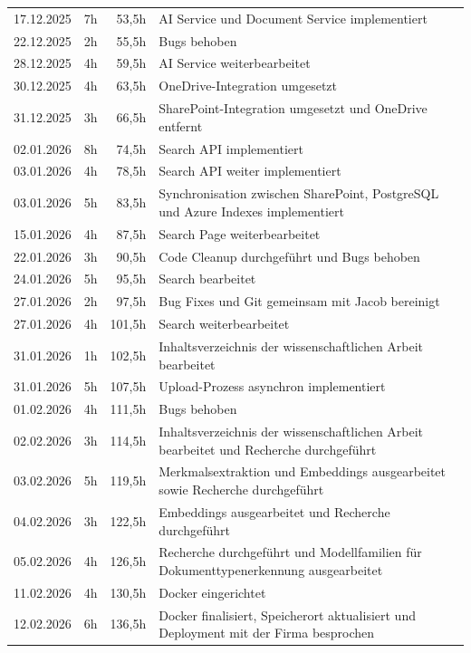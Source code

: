 \begin{longtable}{r | r | r | p{}}
    17.12.2025 & 7h & 53,5h & AI Service und Document Service implementiert \\
    22.12.2025 & 2h & 55,5h & Bugs behoben \\
    28.12.2025 & 4h & 59,5h & AI Service weiterbearbeitet \\
    30.12.2025 & 4h & 63,5h & OneDrive-Integration umgesetzt \\
    31.12.2025 & 3h & 66,5h & SharePoint-Integration umgesetzt und OneDrive entfernt \\
    02.01.2026 & 8h & 74,5h & Search API implementiert \\
    03.01.2026 & 4h & 78,5h & Search API weiter implementiert \\
    03.01.2026 & 5h & 83,5h & Synchronisation zwischen SharePoint, PostgreSQL und Azure Indexes implementiert \\
    15.01.2026 & 4h & 87,5h & Search Page weiterbearbeitet \\
    22.01.2026 & 3h & 90,5h & Code Cleanup durchgeführt und Bugs behoben \\
    24.01.2026 & 5h & 95,5h & Search bearbeitet \\
    27.01.2026 & 2h & 97,5h & Bug Fixes und Git gemeinsam mit Jacob bereinigt \\
    27.01.2026 & 4h & 101,5h & Search weiterbearbeitet \\
    31.01.2026 & 1h & 102,5h & Inhaltsverzeichnis der wissenschaftlichen Arbeit bearbeitet \\
    31.01.2026 & 5h & 107,5h & Upload-Prozess asynchron implementiert \\
    01.02.2026 & 4h & 111,5h & Bugs behoben \\
    02.02.2026 & 3h & 114,5h & Inhaltsverzeichnis der wissenschaftlichen Arbeit bearbeitet und Recherche durchgeführt \\
    03.02.2026 & 5h & 119,5h & Merkmalsextraktion und Embeddings ausgearbeitet sowie Recherche durchgeführt \\
    04.02.2026 & 3h & 122,5h & Embeddings ausgearbeitet und Recherche durchgeführt \\
    05.02.2026 & 4h & 126,5h & Recherche durchgeführt und Modellfamilien für Dokumenttypenerkennung ausgearbeitet \\
    11.02.2026 & 4h & 130,5h & Docker eingerichtet \\
    12.02.2026 & 6h & 136,5h & Docker finalisiert, Speicherort aktualisiert und Deployment mit der Firma besprochen \\

\end{longtable}
